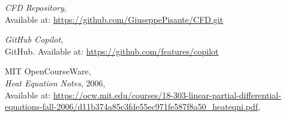 \documentclass{article}
\begin{document}
\begin{thebibliography}{9}
  \textit{CFD Repository},\\
  Available at: \url{https://github.com/GiuseppePisante/CFD.git}
  
  \textit{GitHub Copilot},\\
  GitHub. Available at: \url{https://github.com/features/copilot}
  
  MIT OpenCourseWare,\\
  \textit{Heat Equation Notes}, 2006,\\
  Available at: \url{https://ocw.mit.edu/courses/18-303-linear-partial-differential-equations-fall-2006/d11b374a85c3fde55ec971fe587f8a50_heateqni.pdf},\\
\end{thebibliography}
\end{document}
